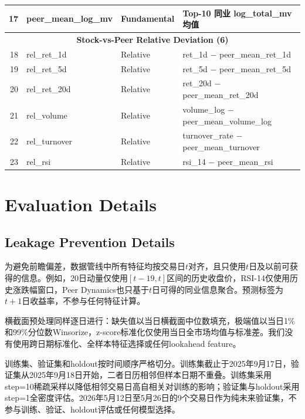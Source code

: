 \begin{table}[H]
\begin{tabular}{@{}rlll@{}}
17 & peer\_mean\_log\_mv   & Fundamental & Top-10 同业 log\_total\_mv 均值 \\
\midrule
\multicolumn{4}{c}{\textbf{Stock-vs-Peer Relative Deviation (6)}} \\
18 & rel\_ret\_1d    & Relative & ret\_1d $-$ peer\_mean\_ret\_1d \\
19 & rel\_ret\_5d    & Relative & ret\_5d $-$ peer\_mean\_ret\_5d \\
20 & rel\_ret\_20d   & Relative & ret\_20d $-$ peer\_mean\_ret\_20d \\
21 & rel\_volume     & Relative & volume\_log $-$ peer\_mean\_volume\_log \\
22 & rel\_turnover   & Relative & turnover\_rate $-$ peer\_mean\_turnover \\
23 & rel\_rsi        & Relative & rsi\_14 $-$ peer\_mean\_rsi \\
\bottomrule
\end{tabular}
\end{table}

\section{Evaluation Details}
\label{sec:appendix_eval_details}

\subsection{Leakage Prevention Details}

为避免前瞻偏差，数据管线中所有特征均按交易日$t$对齐，且只使用$t$日及以前可获得的信息。例如，20日动量仅使用$[t-19,t]$区间的历史收盘价，RSI-14仅使用历史涨跌幅窗口，Peer Dynamics也只基于$t$日可得的同业信息聚合。预测标签为$t+1$日收益率，不参与任何特征计算。

横截面预处理同样逐日进行：缺失值以当日横截面中位数填充，极端值以当日1\%和99\%分位数Winsorize，z-score标准化仅使用当日全市场均值与标准差。我们没有使用跨日期标准化、全样本特征选择或任何lookahead feature。

训练集、验证集和holdout按时间顺序严格切分。训练集截止于2025年9月17日，验证集从2025年9月18日开始，二者日历相邻但样本日期不重叠。训练集采用step=10稀疏采样以降低相邻交易日高自相关对训练的影响；验证集与holdout采用step=1全密度评估。2026年5月12日至5月26日的9个交易日作为纯未来验证集，不参与训练、验证、holdout评估或任何模型选择。

